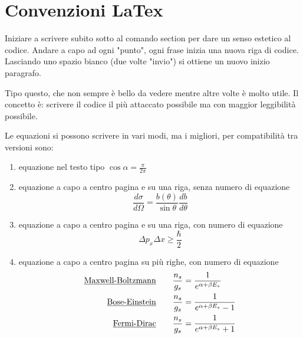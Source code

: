 


\section{Convenzioni LaTex} %
Iniziare a scrivere subito sotto al comando section per dare un senso estetico al codice.
Andare a capo ad ogni "punto", ogni frase inizia una nuova riga di codice.
Lasciando uno spazio bianco (due volte "invio") si ottiene un nuovo inizio paragrafo.

Tipo questo, che non sempre è bello da vedere mentre altre volte è molto utile.
Il concetto è: scrivere il codice il più attaccato possibile ma con maggior leggibilità possibile.

Le equazioni si possono scrivere in vari modi, ma i migliori, per compatibilità tra versioni sono:
\begin{enumerate}
\item equazione nel testo tipo $\cos \alpha = \frac{\pi}{2 \pi}$

\item equazione a capo a centro pagina e su una riga, senza numero di equazione
$$ \frac{d\sigma}{d\Omega}=\frac{b(\theta)}{\sin\theta}\frac{db}{d\theta} $$

\item equazione a capo a centro pagina e su una riga, con numero di equazione 
\begin{equation}
\Delta p_x \Delta x \ge \frac{\hbar}{2}
\end{equation}

\item equazione a capo a centro pagina su più righe, con numero di equazione
\begin{equation}
\begin{split}
\mbox{\underline{Maxwell-Boltzmann}}  \quad\quad  \frac{n_s}{g_s} & = \frac{1}{e^{\alpha + \beta E_s}} \\
\mbox{\underline{Bose-Einstein}}  \quad\quad  \frac{n_s}{g_s} & = \frac{1}{e^{\alpha + \beta E_s} - 1} \\
\mbox{\underline{Fermi-Dirac}}  \quad\quad  \frac{n_s}{g_s} & = \frac{1}{e^{\alpha + \beta E_s} + 1 } 
\end{split}
\end{equation}

\end{enumerate}

